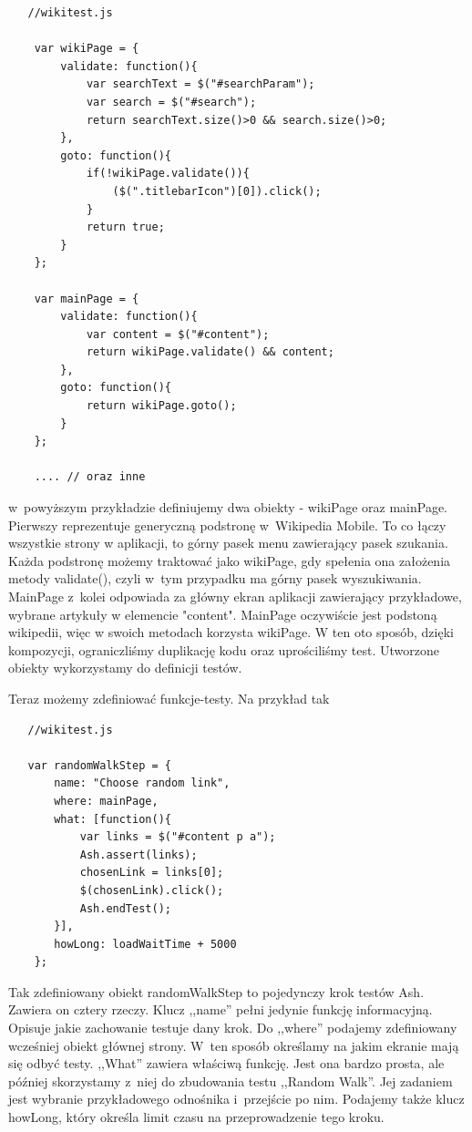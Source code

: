 \documentclass[brudnopis]{xmgr}
\begin{document}
\begin{lstlisting}
   //wikitest.js

    var wikiPage = {
        validate: function(){
            var searchText = $("#searchParam");
            var search = $("#search");
            return searchText.size()>0 && search.size()>0;
        },
        goto: function(){
            if(!wikiPage.validate()){
                ($(".titlebarIcon")[0]).click();
            }
            return true;
        }
    };
    
    var mainPage = {
        validate: function(){
            var content = $("#content");
            return wikiPage.validate() && content;
        },
        goto: function(){
            return wikiPage.goto();
        }
    };

    .... // oraz inne
\end{lstlisting}

w~powyższym przykładzie definiujemy dwa obiekty - wikiPage oraz mainPage. Pierwszy reprezentuje generyczną podstronę w~Wikipedia Mobile. To co łączy wszystkie strony w aplikacji, to górny pasek menu zawierający pasek szukania. Każda podstronę możemy traktować jako wikiPage, gdy spełenia ona założenia metody validate(), czyli w~tym przypadku ma górny pasek wyszukiwania. MainPage z~kolei odpowiada za główny ekran aplikacji zawierający przykładowe, wybrane artykuły w elemencie "content". MainPage oczywiście jest podstoną wikipedii, więc w swoich metodach korzysta wikiPage. W ten oto sposób, dzięki kompozycji, ograniczliśmy duplikację kodu oraz uprościliśmy test. Utworzone obiekty wykorzystamy do definicji testów.

Teraz możemy zdefiniować funkcje-testy. Na przykład tak

\begin{lstlisting}
   //wikitest.js

   var randomWalkStep = {
       name: "Choose random link",
       where: mainPage,
       what: [function(){
           var links = $("#content p a");
           Ash.assert(links);
           chosenLink = links[0];
           $(chosenLink).click();
           Ash.endTest();
       }],
       howLong: loadWaitTime + 5000
    };
\end{lstlisting}

Tak zdefiniowany obiekt randomWalkStep to pojedynczy krok testów Ash. Zawiera on cztery rzeczy. Klucz ,,name'' pełni jedynie funkcję informacyjną. Opisuje jakie zachowanie testuje dany krok. Do ,,where'' podajemy zdefiniowany wcześniej obiekt głównej strony. W~ten sposób określamy na jakim ekranie mają się odbyć testy. ,,What'' zawiera właściwą funkcję. Jest ona bardzo prosta, ale później skorzystamy z~niej do zbudowania testu ,,Random Walk''. Jej zadaniem jest wybranie przykładowego odnośnika i~przejście po nim. Podajemy także klucz howLong, który określa limit czasu na przeprowadzenie tego kroku.
\end{document}
